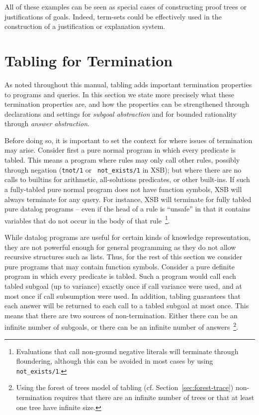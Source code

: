All of these examples can be seen as special cases of constructing
proof trees or justifications of goals.  Indeed, term-sets could be
effectively used in the construction of a justification or explanation
system.

\section{Tabling for Termination} \label{sec:tabling-termination}
%
As noted throughout this manual, tabling adds important termination
properties to programs and queries.  In this section we state more
precisely what these termination properties are, and how the
properties can be strengthened through declarations and settings for
{\em subgoal abstraction} and for bounded rationality through {\em
  answer abstraction}.

Before doing so, it is important to set the context for where issues
of termination may arise.  Consider first a pure normal program in
which every predicate is tabled.  This means a program where rules may
only call other rules, possibly through negation ({\tt tnot/1} or {\tt
  not\_exists/1} in XSB); but where there are no calls to builtins for
arithmetic, all-solutions predicates, or other built-ins.  If such a
fully-tabled pure normal program does not have function symbols, XSB
will always terminate for any query.  For instance, XSB will terminate
for fully tabled pure datalog programs -- even if the head of a rule
is ``unsafe'' in that it contains variables that do not occur in the
body of that rule~\footnote{Evaluations that call non-ground negative
  literals will terminate through floundering, although this can be
  avoided in most cases by using {\tt not\_exists/1}.}.

While datalog programs are useful for certain kinds of knowledge
representation, they are not powerful enough for general programming
as they do not allow recursive structures such as lists.  Thus, for
the rest of this section we consider pure programs that may contain
function symbols.  Consider a pure definite program in which every
predicate is tabled.  Such a program would call each tabled subgoal
(up to variance) exactly once if call variance were used, and at most
once if call subsumption were used.  In addition, tabling guarantees
that each answer will be returned to each call to a tabled subgoal at
most once.  This means that there are two sources of non-termination.
Either there can be an infinite number of subgoals, or there can be an
infinite number of answers~\footnote{Using the forest of trees model
  of tabling (cf. Section~\ref{sec:forest-trace}) non-termination
  requires that there are an infinite number of trees or that at least
  one tree have infinite size.}.

